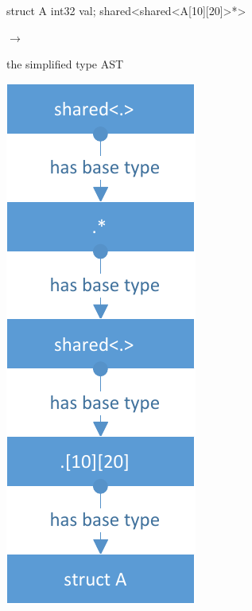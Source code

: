 \begin{minipage}{0.3\textwidth}
\begin{ccode}
struct A { int32 val; }
shared<shared<A[10][20]>*>
\end{ccode}
\end{minipage}
\begin{minipage}{0.3\textwidth}
\begin{center}
\quad$\longrightarrow$\qquad

the simplified type AST
\end{center}
\end{minipage}
\begin{minipage}{0.5\textwidth}
\includegraphics[scale=0.7]{pics/AstForBaseTypes}
\end{minipage}

